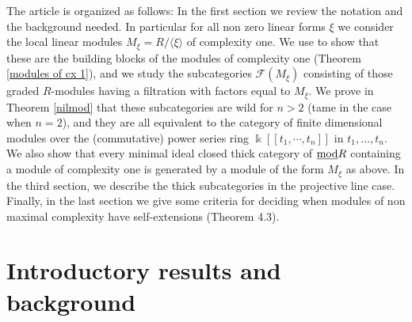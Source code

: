 \documentclass[10pt]{amsart}
\begin{document}
\medskip
\noindent The article is organized as follows: In the first section 
we review the notation and the background needed. In particular for all non zero linear forms $\xi$ we consider the local linear 
modules $M_{\xi}=R/{\langle\xi\rangle}$ of complexity one. We use \cite{E} to show that these are the building blocks of the modules 
of complexity one (Theorem \ref{modules of cx 1}), and we study the subcategories $\mathcal F(M_{\xi})$ consisting of those graded 
$R$-modules having a filtration with factors equal to $M_{\xi}$. We prove in Theorem \ref{nilmod} that these subcategories  are 
wild for $n>2$ (tame in the case when $n=2$), and they are all equivalent to the category of finite dimensional modules over the (commutative) power series ring $\Bbbk[[t_1,\cdots,t_n]]$ in $t_1,\ldots,t_n$. We also show that every minimal ideal closed thick category of $\underline{\operatorname{mod}} R$  
containing a module of complexity one is generated by a module of the form $M_{\xi}$ as above. In the third section, we describe the thick subcategories in the projective line case. Finally, in the last section we give some criteria for deciding when modules of non maximal complexity have self-extensions (Theorem 4.3). 





\section{Introductory results and background}\label{intro}
%
 
\end{document}
